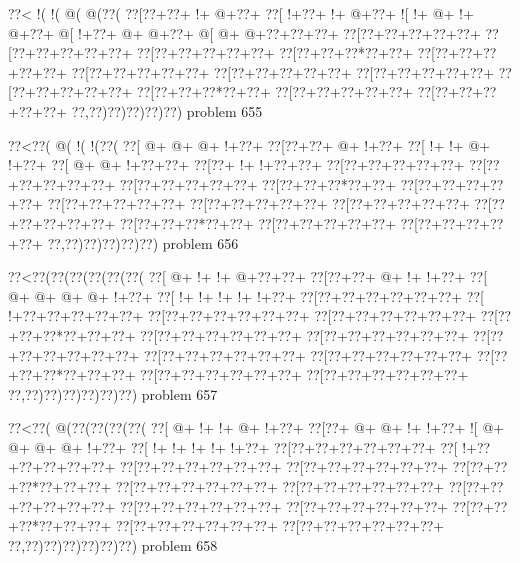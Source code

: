 \vbox{\vbox{\goo
\0??<\- !(\- !(\- @(\- @(\0??(
\0??[\0??+\0??+\- !+\- @+\0??+
\0??[\- !+\0??+\- !+\- @+\0??+
\- ![\- !+\- @+\- !+\- @+\0??+
\- @[\- !+\0??+\- @+\- @+\0??+
\- @[\- @+\- @+\0??+\0??+\0??+
\0??[\0??+\0??+\0??+\0??+\0??+
\0??[\0??+\0??+\0??+\0??+\0??+
\0??[\0??+\0??+\0??+\0??+\0??+
\0??[\0??+\0??+\0??*\0??+\0??+
\0??[\0??+\0??+\0??+\0??+\0??+
\0??[\0??+\0??+\0??+\0??+\0??+
\0??[\0??+\0??+\0??+\0??+\0??+
\0??[\0??+\0??+\0??+\0??+\0??+
\0??[\0??+\0??+\0??+\0??+\0??+
\0??[\0??+\0??+\0??*\0??+\0??+
\0??[\0??+\0??+\0??+\0??+\0??+
\0??[\0??+\0??+\0??+\0??+\0??+
\0??,\0??)\0??)\0??)\0??)\0??)
}
\hfil problem 655\hfil\break
}

\vbox{\vbox{\goo
\0??<\0??(\- @(\- !(\- !(\0??(
\0??[\- @+\- @+\- @+\- !+\0??+
\0??[\0??+\0??+\- @+\- !+\0??+
\0??[\- !+\- !+\- @+\- !+\0??+
\0??[\- @+\- @+\- !+\0??+\0??+
\0??[\0??+\- !+\- !+\0??+\0??+
\0??[\0??+\0??+\0??+\0??+\0??+
\0??[\0??+\0??+\0??+\0??+\0??+
\0??[\0??+\0??+\0??+\0??+\0??+
\0??[\0??+\0??+\0??*\0??+\0??+
\0??[\0??+\0??+\0??+\0??+\0??+
\0??[\0??+\0??+\0??+\0??+\0??+
\0??[\0??+\0??+\0??+\0??+\0??+
\0??[\0??+\0??+\0??+\0??+\0??+
\0??[\0??+\0??+\0??+\0??+\0??+
\0??[\0??+\0??+\0??*\0??+\0??+
\0??[\0??+\0??+\0??+\0??+\0??+
\0??[\0??+\0??+\0??+\0??+\0??+
\0??,\0??)\0??)\0??)\0??)\0??)
}
\hfil problem 656\hfil\break
}

\vbox{\vbox{\goo
\0??<\0??(\0??(\0??(\0??(\0??(\0??(
\0??[\- @+\- !+\- !+\- @+\0??+\0??+
\0??[\0??+\0??+\- @+\- !+\- !+\0??+
\0??[\- @+\- @+\- @+\- @+\- !+\0??+
\0??[\- !+\- !+\- !+\- !+\- !+\0??+
\0??[\0??+\0??+\0??+\0??+\0??+\0??+
\0??[\- !+\0??+\0??+\0??+\0??+\0??+
\0??[\0??+\0??+\0??+\0??+\0??+\0??+
\0??[\0??+\0??+\0??+\0??+\0??+\0??+
\0??[\0??+\0??+\0??*\0??+\0??+\0??+
\0??[\0??+\0??+\0??+\0??+\0??+\0??+
\0??[\0??+\0??+\0??+\0??+\0??+\0??+
\0??[\0??+\0??+\0??+\0??+\0??+\0??+
\0??[\0??+\0??+\0??+\0??+\0??+\0??+
\0??[\0??+\0??+\0??+\0??+\0??+\0??+
\0??[\0??+\0??+\0??*\0??+\0??+\0??+
\0??[\0??+\0??+\0??+\0??+\0??+\0??+
\0??[\0??+\0??+\0??+\0??+\0??+\0??+
\0??,\0??)\0??)\0??)\0??)\0??)\0??)
}
\hfil problem 657\hfil\break
}

\vbox{\vbox{\goo
\0??<\0??(\- @(\0??(\0??(\0??(\0??(
\0??[\- @+\- !+\- !+\- @+\- !+\0??+
\0??[\0??+\- @+\- @+\- !+\- !+\0??+
\- ![\- @+\- @+\- @+\- @+\- !+\0??+
\0??[\- !+\- !+\- !+\- !+\- !+\0??+
\0??[\0??+\0??+\0??+\0??+\0??+\0??+
\0??[\- !+\0??+\0??+\0??+\0??+\0??+
\0??[\0??+\0??+\0??+\0??+\0??+\0??+
\0??[\0??+\0??+\0??+\0??+\0??+\0??+
\0??[\0??+\0??+\0??*\0??+\0??+\0??+
\0??[\0??+\0??+\0??+\0??+\0??+\0??+
\0??[\0??+\0??+\0??+\0??+\0??+\0??+
\0??[\0??+\0??+\0??+\0??+\0??+\0??+
\0??[\0??+\0??+\0??+\0??+\0??+\0??+
\0??[\0??+\0??+\0??+\0??+\0??+\0??+
\0??[\0??+\0??+\0??*\0??+\0??+\0??+
\0??[\0??+\0??+\0??+\0??+\0??+\0??+
\0??[\0??+\0??+\0??+\0??+\0??+\0??+
\0??,\0??)\0??)\0??)\0??)\0??)\0??)
}
\hfil problem 658\hfil\break
}

